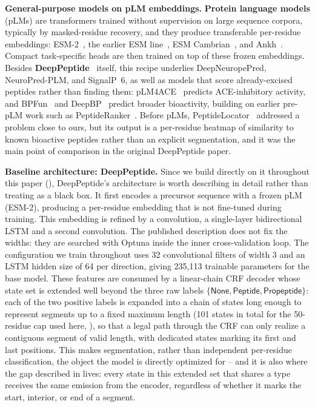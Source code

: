 \documentclass{article}
\begin{document}
\textbf{General-purpose models on pLM embeddings.} \textbf{Protein language models} (pLMs) are transformers trained without supervision on large sequence corpora, typically by masked-residue recovery, and they produce transferable per-residue embeddings: ESM-2~\citep{lin2023esm2}, the earlier ESM line~\citep{esm2_2019}, ESM Cambrian~\citep{esm_cambrian_blog_2024,ESM-family}, and Ankh~\citep{ankh2023}. Compact task-specific heads are then trained on top of these frozen embeddings. Besides \textbf{DeepPeptide}~\citep{deeppeptide2023} itself, this recipe underlies DeepNeuropePred, NeuroPred-PLM, and SignalP~6, as well as models that score already-excised peptides rather than finding them: pLM4ACE~\citep{du2024plm4ace} predicts ACE-inhibitory activity, and BPFun~\citep{bpfun2025} and DeepBP~\citep{zhang2024deepbp} predict broader bioactivity, building on earlier pre-pLM work such as PeptideRanker~\citep{mooney2012peptideranker}. Before pLMs, PeptideLocator~\citep{mooney2013peptidelocator} addressed a problem close to ours, but its output is a per-residue heatmap of similarity to known bioactive peptides rather than an explicit segmentation, and it was the main point of comparison in the original DeepPeptide paper.

\textbf{Baseline architecture: DeepPeptide.} Since we build directly on it throughout this paper (), DeepPeptide's architecture is worth describing in detail rather than treating as a black box. It first encodes a precursor sequence with a frozen pLM (ESM-2), producing a per-residue embedding that is not fine-tuned during training. This embedding is refined by a convolution, a single-layer bidirectional LSTM and a second convolution. The published description does not fix the widths: they are searched with Optuna inside the inner cross-validation loop. The configuration we train throughout uses 32 convolutional filters of width 3 and an LSTM hidden size of 64 per direction, giving 235{,}113 trainable parameters for the base model. These features are consumed by a linear-chain CRF decoder whose state set is extended well beyond the three raw labels $\{\textsf{None}, \textsf{Peptide}, \textsf{Propeptide}\}$: each of the two positive labels is expanded into a chain of states long enough to represent segments up to a fixed maximum length (101 states in total for the 50-residue cap used here, ), so that a legal path through the CRF can only realize a contiguous segment of valid length, with dedicated states marking its first and last positions. This makes segmentation, rather than independent per-residue classification, the object the model is directly optimized for -- and it is also where the gap described in  lives: every state in this extended set that shares a type receives the same emission from the encoder, regardless of whether it marks the start, interior, or end of a segment.
\end{document}
